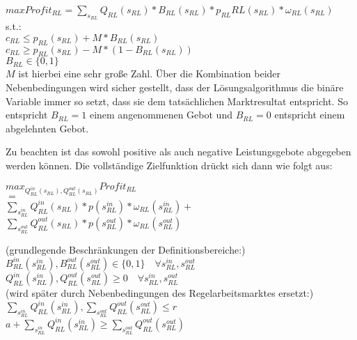 $max Profit_{RL} = \sum_{s_{RL}} Q_{RL}(s_{RL}) * B_{RL}(s_{RL}) * p_{RL}{RL}(s_{RL}) * \omega_{RL}(s_{RL})$\\
s.t.:\\
$c_{RL} \leq p_{RL}(s_{RL}) + M * B_{RL}(s_{RL}) $\\
$c_{RL} \geq p_{RL}(s_{RL}) - M * (1 - B_{RL}(s_{RL})) $\\
$B_{RL} \in \{0,1\}$\\
$M$ ist hierbei eine sehr große Zahl. Über die Kombination beider Nebenbedingungen wird sicher gestellt, dass der Lösungsalgorithmus die binäre Variable immer so setzt, dass sie dem tatsächlichen Marktresultat entspricht. So entspricht $B_{RL} = 1$ einem angenommenen Gebot und $B_{RL} = 0$ entspricht einem abgelehnten Gebot.\\




Zu beachten ist das sowohl positive als auch negative Leistungsgebote abgegeben werden können. Die vollständige Zielfunktion drückt sich dann wie folgt aus:\\

\begin{center}
	$max_{Q^{in}_{RL}(s_{RL}), Q^{out}_{RL}(s_{RL})} Profit_{RL}$\\
	$=$\\
	$\sum_{s^{in}_{RL}} Q^{in}_{RL}(s_{RL}) * p(s^{in}_{RL}) * \omega_{RL}(s^{in}_{RL}) +$\\
	$\sum_{s^{out}_{RL}} Q^{out}_{RL}(s_{RL}) * p(s^{out}_{RL}) * \omega_{RL}(s^{out}_{RL})$\\
\end{center}


(grundlegende Beschränkungen der Definitionsbereiche:)\\
$B^{in}_{RL}(s^{in}_{RL}),B^{out}_{RL}(s^{out}_{RL}) \in \{0,1\}\quad\forall s^{in}_{RL},s^{out}_{RL} $\\
$Q^{in}_{RL}(s^{in}_{RL}),Q^{out}_{RL}(s^{out}_{RL}) \geq 0\quad\forall  s^{in}_{RL},s^{out}_{RL} $\\
(wird später durch Nebenbedingungen des Regelarbeitsmarktes ersetzt:)\\
$\sum_{s^{in}_{RL}}Q^{in}_{RL}(s^{in}_{RL}),\sum_{s^{out}_{RL}}Q^{out}_{RL}(s^{out}_{RL}) \leq r$\\
$a + \sum_{s^{in}_{RL}}Q^{in}_{RL}(s^{in}_{RL})\geq \sum_{s^{out}_{RL}}Q^{out}_{RL}(s^{out}_{RL}) $\\

